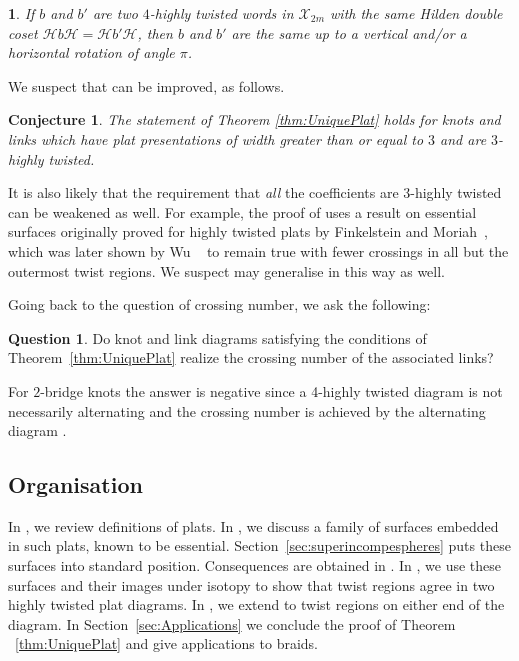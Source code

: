 \documentclass[12pt,reqno]{amsart}
\theoremstyle{plain}
\newtheorem{conjecture}[theorem]{Conjecture}
\newtheorem*{namedtheorem}{\theoremname}
\newcommand{\theoremname}{testing}
\newenvironment{named}[1]{\renewcommand{\theoremname}{#1}\begin{namedtheorem}}{\end{namedtheorem}}
\theoremstyle{definition}
\newtheorem{question}[theorem]{Question}
\begin{document}
\begin{named}{\Cref{cor:HildenDoubleCosets}}
If $b$ and $b'$ are two $4$-highly twisted words in $\mathcal{X}_{2m}$ with the same 
Hilden double coset $\mathcal{H}b\mathcal{H} = \mathcal{H}b'\mathcal{H}$, then $b$ 
and $b'$ are the same up to a vertical and/or a horizontal rotation of angle $\pi$. 
\end{named}

We suspect that  can be improved, as follows.
\begin{conjecture}\label{conj: three also} The statement of Theorem 
\ref{thm:UniquePlat} holds for knots and links which have plat presentations
of width greater than or equal to $3$ and are $3$-highly twisted.
\end{conjecture}

It is also likely that the requirement that \emph{all} the coefficients are
$3$-highly twisted can be weakened as well. 
For example, the proof of  uses a result on essential 
surfaces originally proved for highly twisted plats by Finkelstein and 
Moriah~\cite{FM1, FM2}, which was later shown by Wu ~\cite{Wu} to remain 
true with fewer crossings in all but the outermost twist regions. We suspect 
 may generalise in this way as well. 

Going back to the question of crossing number, we ask the following:

\begin{question}\label{con:CrossingNumber}
Do knot and link diagrams satisfying the conditions of
Theorem~\ref{thm:UniquePlat} realize the crossing number of the
associated links?
\end{question}

For $2$-bridge knots the answer is negative since a 4-highly twisted diagram is not 
necessarily alternating and the crossing number is achieved by the alternating diagram 
\cite{kauffman1987state, murasugi1987jones,thistlethwaite1988kauffman}.

\subsection{Organisation}
In , we review definitions of plats. In 
, we discuss a family of surfaces embedded in such plats, known 
to be essential. Section~\ref{sec:superincompespheres} puts these surfaces into 
standard position. Consequences are obtained in . In 
, we use these surfaces and their images under isotopy to show 
that twist regions agree in two highly twisted plat diagrams. In , 
we extend to twist regions on either end of the diagram. In Section~\ref{sec:Applications} 
we conclude the proof of Theorem ~\ref{thm:UniquePlat} and give applications to braids. 
\end{document}
